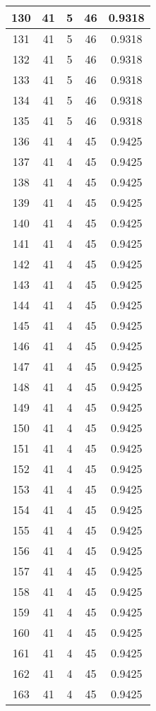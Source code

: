 \documentclass[letterpaper, 12pt]{article}
\begin{document}
\begin{longtable}{|c|c|c|c|c|}
\hline
130 & 41 & 5 & 46 & 0.9318 \\
\hline
131 & 41 & 5 & 46 & 0.9318 \\
\hline
132 & 41 & 5 & 46 & 0.9318 \\
\hline
133 & 41 & 5 & 46 & 0.9318 \\
\hline
134 & 41 & 5 & 46 & 0.9318 \\
\hline
135 & 41 & 5 & 46 & 0.9318 \\
\hline
136 & 41 & 4 & 45 & 0.9425 \\
\hline
137 & 41 & 4 & 45 & 0.9425 \\
\hline
138 & 41 & 4 & 45 & 0.9425 \\
\hline
139 & 41 & 4 & 45 & 0.9425 \\
\hline
140 & 41 & 4 & 45 & 0.9425 \\
\hline
141 & 41 & 4 & 45 & 0.9425 \\
\hline
142 & 41 & 4 & 45 & 0.9425 \\
\hline
143 & 41 & 4 & 45 & 0.9425 \\
\hline
144 & 41 & 4 & 45 & 0.9425 \\
\hline
145 & 41 & 4 & 45 & 0.9425 \\
\hline
146 & 41 & 4 & 45 & 0.9425 \\
\hline
147 & 41 & 4 & 45 & 0.9425 \\
\hline
148 & 41 & 4 & 45 & 0.9425 \\
\hline
149 & 41 & 4 & 45 & 0.9425 \\
\hline
150 & 41 & 4 & 45 & 0.9425 \\
\hline
151 & 41 & 4 & 45 & 0.9425 \\
\hline
152 & 41 & 4 & 45 & 0.9425 \\
\hline
153 & 41 & 4 & 45 & 0.9425 \\
\hline
154 & 41 & 4 & 45 & 0.9425 \\
\hline
155 & 41 & 4 & 45 & 0.9425 \\
\hline
156 & 41 & 4 & 45 & 0.9425 \\
\hline
157 & 41 & 4 & 45 & 0.9425 \\
\hline
158 & 41 & 4 & 45 & 0.9425 \\
\hline
159 & 41 & 4 & 45 & 0.9425 \\
\hline
160 & 41 & 4 & 45 & 0.9425 \\
\hline
161 & 41 & 4 & 45 & 0.9425 \\
\hline
162 & 41 & 4 & 45 & 0.9425 \\
\hline
163 & 41 & 4 & 45 & 0.9425 \\

\end{longtable}
\end{document}
